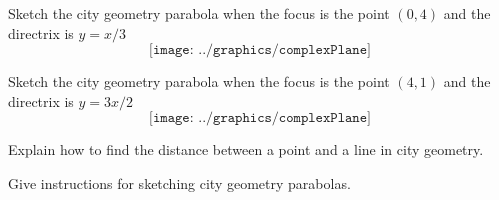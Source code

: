 \break

\begin{prob}
Sketch the city geometry parabola when the focus is the point $(0,4)$
and the directrix is $y=x/3$
\[
\texttt{[image: ../graphics/complexPlane]}
\]
\end{prob}

\break

\begin{prob}
Sketch the city geometry parabola when the focus is the point $(4,1)$
and the directrix is $y=3x/2$
\[
\texttt{[image: ../graphics/complexPlane]}
\]
\end{prob}

\begin{prob}
Explain how to find the distance between a point and a line in city
geometry.
\end{prob}


\begin{prob}
Give instructions for sketching city geometry parabolas.
\end{prob}


